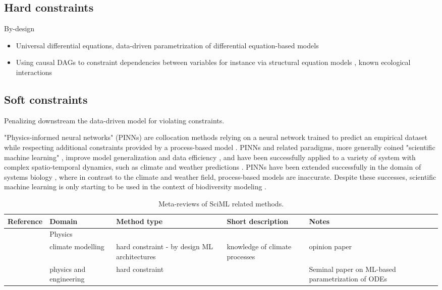 \subsection{Hard constraints}
By-design
\begin{itemize}
    \item Universal differential equations, data-driven parametrization of differential equation-based models
    \item Using causal DAGs to constraint dependencies between variables for instance via structural equation models \cite{da2024towards}, known ecological interactions \cite{poggiato2025integrating}
\end{itemize}

\subsection{Soft constraints}
Penalizing downstream the data-driven model for violating constraints.

"Physics-informed neural networks" (PINNs) are collocation methods relying on a neural network trained to predict an empirical dataset while respecting additional constraints provided by a process-based model \cite{Raissi2019, Kashinath2021,daw2021,bezenac2018}. PINNs and related paradigms, more generally coined "scientific machine learning" \cite{Rackauckas2020}, improve model generalization and data efficiency \cite{Raissi2019, Rackauckas2020}, and have been successfully applied to a variety of system with complex spatio-temporal dynamics, such as climate and weather predictions \cite{Kashinath2021, lam2023, kochkov2024}. PINNs have been extended successfully in the domain of systems biology \cite{lagergren2020, Yazdani2020}, where in contrast to the climate and weather field, process-based models are inaccurate. Despite these successes, scientific machine learning is only starting to be used in the context of biodiversity modeling \cite{boussange2024}. 

\begin{table}[htbp]
\centering
\caption{Meta-reviews of SciML related methods.}

\small
\begin{tabular}{@{}p{2cm}>{\raggedright\arraybackslash}p{2.5cm}>{\raggedright\arraybackslash}p{2cm}>{\raggedright\arraybackslash}p{3cm}>{\raggedright\arraybackslash}p{2cm}@{}}
\toprule
\textbf{Reference} & \textbf{Domain} & \textbf{Method type} & \textbf{Short description} & \textbf{Notes} \\
\midrule
\cite{karniadakis2021physics} & Physics & & &\\
\cite{beucler2024} & climate modelling & hard constraint - by design ML architectures & knowledge of climate processes & opinion paper \\
\cite{rackauckas2020} &physics and engineering & hard constraint & & Seminal paper on ML-based parametrization of ODEs\\
\bottomrule
\end{tabular}
\end{table}


